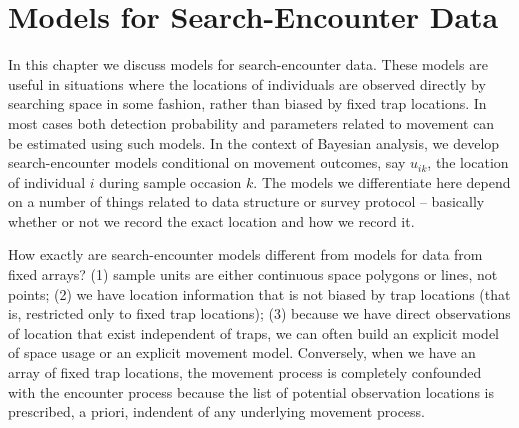 \chapter{Models for  Search-Encounter Data}
\label{chapt.search-encounter}

\vspace{0.3cm}


In this chapter we discuss models for search-encounter data. These
models are useful in situations where the locations of individuals are
observed directly by searching space in some fashion, rather than
biased by fixed trap locations. In most cases both detection
probability and parameters related to movement can be estimated using
such models. In the context of Bayesian analysis, we develop
search-encounter models conditional on movement outcomes, say
$u_{ik}$, the location of individual $i$ during sample occasion $k$.
The models we differentiate here depend on a number of things related
to data structure or survey protocol -- basically whether or not we
record the exact location and how we record it.

How exactly are search-encounter models different from models for data
from fixed arrays?  (1) sample units are either continuous space
polygons or lines, not points; (2) we have location information that
is not biased by trap locations (that is, restricted only to fixed
trap locations); (3) because we have direct observations of location
that exist independent of traps, we can often build an explicit model
of space usage or an explicit movement model.
Conversely, 
 when we have an array of fixed trap locations, the
movement process is completely confounded with the encounter process
because the list of potential observation locations is prescribed, a
priori, indendent of any underlying movement process.

